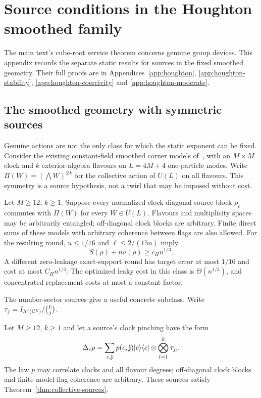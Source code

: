 \section{Source conditions in the Houghton smoothed family}
\label{app:houghton-sources}

The main text's cube-root service theorem concerns genuine group
devices. This appendix records the separate static results for
sources in the fixed smoothed geometry. Their full proofs are in
Appendices~\ref{app:houghton}, \ref{app:houghton-stability},
\ref{app:houghton-coercivity} and \ref{app:houghton-moderate}.

\subsection{The smoothed geometry with symmetric sources}

Genuine actions are not the only class for which the static exponent
can be fixed. Consider the existing constant-field smoothed corner
models of~\cite[Section~4.2]{DouglasMghirbiB}, with an $M\times M$
clock and $k$ exterior-algebra flavours on $L=4M+4$ one-particle modes.
Write $\Pi(W)=(\bigwedge W)^{\otimes k}$ for the collective action of
$U(L)$ on all flavours. This symmetry is a source hypothesis, not a
twirl that may be imposed without cost.

\begin{theorem}\label{thm:collective-sources}
Let $M\geq12$, $k\geq1$. Suppose every normalized clock-diagonal source
block $\rho_c$ commutes with $\Pi(W)$ for every $W\in U(L)$.
Flavours and multiplicity spaces may be arbitrarily entangled;
off-diagonal clock blocks are arbitrary. Finite direct sums of these
models with arbitrary coherence between flags are also allowed.
For the resulting round, $u\leq1/16$ and $\ell\leq2/(15n)$ imply
\[
 S(\rho)+na(\rho)\geq c_Hn^{1/3}.
\]
A different zero-leakage exact-support round has target error at most
$1/16$ and cost at most $C_Hn^{1/3}$. The optimized leaky cost in this
class is $\Theta(n^{1/3})$, and concentrated replacement costs at most
a constant factor.
\end{theorem}

The number-sector sources give a useful concrete subclass. Write
$\tau_j=I_{\Lambda^j(\mathbb C^L)}/\binom Lj$.

\begin{corollary}\label{thm:number-sectors}
Let $M\geq12$, $k\geq1$ and let a source's clock pinching have the form
\[
 \Delta_c\rho=\sum_{c,\mathbf j}p(c,\mathbf j)\lvert c\rangle\langle c\rvert
       \otimes\bigotimes_{l=1}^k\tau_{j_l}.
\]
The law $p$ may correlate clocks and all flavour degrees; off-diagonal
clock blocks and finite model-flag coherence are arbitrary.
These sources satisfy Theorem~\ref{thm:collective-sources}.
\end{corollary}

